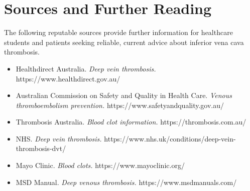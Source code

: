 \section*{Sources and Further Reading}
The following reputable sources provide further information for healthcare students and patients seeking reliable, current advice about inferior vena cava thrombosis.
\begin{itemize}
    \item Healthdirect Australia. \textit{Deep vein thrombosis.} https://www.healthdirect.gov.au/
    \item Australian Commission on Safety and Quality in Health Care. \textit{Venous thromboembolism prevention.} https://www.safetyandquality.gov.au/
    \item Thrombosis Australia. \textit{Blood clot information.} https://thrombosis.com.au/
    \item NHS. \textit{Deep vein thrombosis.} https://www.nhs.uk/conditions/deep-vein-thrombosis-dvt/
    \item Mayo Clinic. \textit{Blood clots.} https://www.mayoclinic.org/
    \item MSD Manual. \textit{Deep venous thrombosis.} https://www.msdmanuals.com/
\end{itemize}
